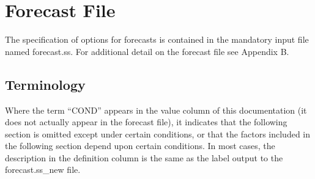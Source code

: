 \section{Forecast File}
The specification of options for forecasts is contained in the mandatory input file named forecast.ss.  For additional detail on the forecast file see Appendix B.


\subsection{Terminology}
Where the term “COND” appears in the value column of this documentation (it does not actually appear in the forecast file), it indicates that the following section is omitted except under certain conditions, or that the factors included in the following section depend upon certain conditions. In most cases, the description in the definition column is the same as the label output to the forecast.ss\_new file.

